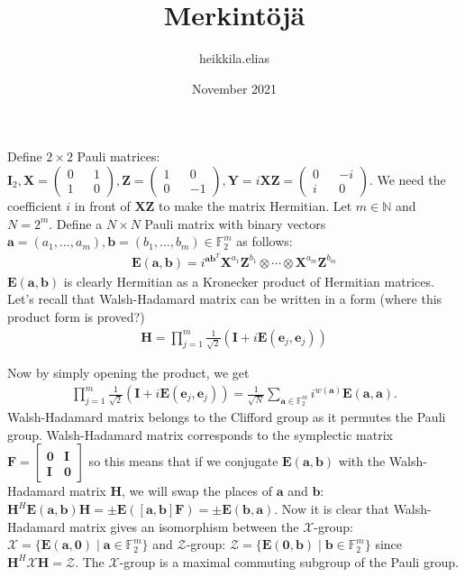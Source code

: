 \documentclass{article}
\title{Merkintöjä}
\author{heikkila.elias }
\date{November 2021}
\begin{document}
	Define $2 \times 2$ Pauli matrices: $\mathbf{I}_2, \mathbf{X} = \begin{pmatrix} 0 && 1 \\ 1 && 0 \end{pmatrix}, \mathbf{Z} = \begin{pmatrix} 1 && 0 \\ 0 && -1 \end{pmatrix}, \mathbf{Y} = i\mathbf{X}\mathbf{Z} = \begin{pmatrix} 0 && -i \\ i && 0 \end{pmatrix}$. We need the coefficient $i$ in front of $\mathbf{XZ}$ to make the matrix Hermitian.
	Let $m \in \mathbb{N}$ and $N = 2^m$. Define a $N \times N$ Pauli matrix with binary vectors $\mathbf{a} = (a_1, ..., a_m), \mathbf{b} = (b_1,..., b_m) \in \mathbb{F}_2^m$ as follows:
	\begin{align*}
		\mathbf{E}(\mathbf{a}, \mathbf{b}) = i^{\mathbf{a}\mathbf{b}^T} \mathbf{X}^{a_1}\mathbf{Z}^{b_1} \otimes \cdots \otimes \mathbf{X}^{a_m}\mathbf{Z}^{b_m}
	\end{align*}
	$\mathbf{E}(\mathbf{a}, \mathbf{b})$ is clearly Hermitian as a Kronecker product of Hermitian matrices.
	Let's recall that Walsh-Hadamard matrix can be written in a form (where this product form is proved?)
	\begin{align*}
		\mathbf{H} = \prod_{j=1}^m \frac{1}{\sqrt{2}} (\mathbf{I} + i\mathbf{E}(\mathbf{e}_j, \mathbf{e}_j))
	\end{align*}
	
	Now by simply opening the product, we get
	\begin{align*}
		\prod_{j=1}^m \frac{1}{\sqrt{2}} (\mathbf{I} + i\mathbf{E}(\mathbf{e}_j, \mathbf{e}_j)) = \frac{1}{\sqrt{N}} \sum_{\mathbf{a} \in \mathbb{F}^m_2} i^{w(\mathbf{a})}\mathbf{E}(\mathbf{a},\mathbf{a}).
	\end{align*}
	Walsh-Hadamard matrix belongs to the Clifford group as it permutes the Pauli group. Walsh-Hadamard matrix corresponds to the symplectic matrix $\mathbf{F} = \begin{bmatrix}
		\mathbf{0} & \mathbf{I} \\
		\mathbf{I} & \mathbf{0}
	\end{bmatrix}$
	so this means that if we conjugate $\mathbf{E}(\mathbf{a},\mathbf{b})$ with the Walsh-Hadamard matrix $\mathbf{H}$, we will swap the places of $\mathbf{a}$ and $\mathbf{b}$: $\mathbf{H}^H\mathbf{E}(\mathbf{a},\mathbf{b})\mathbf{H} = \pm \mathbf{E}(\left[\mathbf{a},\mathbf{b}\right]\mathbf{F}) = \pm \mathbf{E}(\mathbf{b},\mathbf{a})$. Now it is clear that Walsh-Hadamard matrix gives an isomorphism between the $\mathcal{X}$-group: $\mathcal{X} = \{\mathbf{E}(\mathbf{a},\mathbf{0}) \mid \mathbf{a} \in \mathbb{F}^m_2 \}$ and $\mathcal{Z}$-group: $\mathcal{Z} = \{\mathbf{E}(\mathbf{0},\mathbf{b}) \mid \mathbf{b} \in \mathbb{F}^m_2 \}$ since $\mathbf{H}^H\mathcal{X}\mathbf{H} = \mathcal{Z}$. The $\mathcal{X}$-group is a maximal commuting subgroup of the Pauli group.
	
\end{document}
